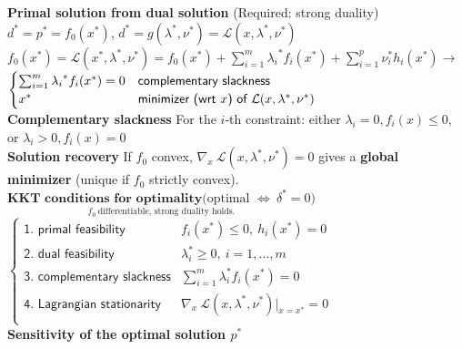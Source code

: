 \documentclass[a4paper]{article}
\begin{document}
\vspace{-0.6cm}
\noindent
\textbf{Primal solution from dual solution} (Required: strong duality) $d^*=p^*=f_0(x^*)$, $d^*=g(\lambda^*,\nu^*)=\mathcal{L}(x,\lambda^*,\nu^*)$  \\
$f_0(x^*)=\mathcal{L}(x^*,\lambda^*,\nu^*)=f_0(x^*)+\sum_{i=1}^m {\lambda_i}^*f_i(x^*) + \sum_{i=1}^p \nu_i^*{h_i(x^*)}\to$
$\begin{cases}
    \sum_{i=1}^m {\lambda_i}^*f_i(x^*)=0&\textsf{complementary slackness}\\
    x^*&\textsf{minimizer (wrt $x$) of} \ {\small{\mathcal{L}(x,\lambda^*,\nu^*)}}
\end{cases}$\\
\textbf{\small Complementary slackness} For the $i$-th constraint: either $\lambda_i=0, f_i(x)\le0$, or $\lambda_i>0, f_i(x)=0$\\
\textbf{\small Solution recovery} If $f_0$ convex, $\nabla_x \ {\mathcal{L}(x,\lambda^*, \nu^*)}=0$ gives a \textbf{global minimizer} (unique  if $f_0$ strictly convex).\\
$\underset{f_0 \ \text{differentiable, strong duality holds.}}{\textbf{KKT conditions for optimality} \text{(optimal $\iff \ \delta^*=0$)}}$    $\begin{cases}
    \textsf{1. primal feasibility}&f_i(x^*)\le0, \ h_i(x^*)=0 \\
    \textsf{2. dual feasibility}&\lambda_i^*\ge0, \ i=1,...,m\\
    \textsf{3. complementary slackness}&\sum_{i=1}^m {\lambda_i^*}f_i(x^*)=0\\
    \textsf{4. Lagrangian stationarity}&\nabla_x \ {\mathcal{L}(x,\lambda^*, \nu^*)}\big|_{x=x^*}=0\\
\end{cases}$\\
\textbf{Sensitivity of the optimal solution $p^*$}
\vspace{-0.3cm}
\end{document}
